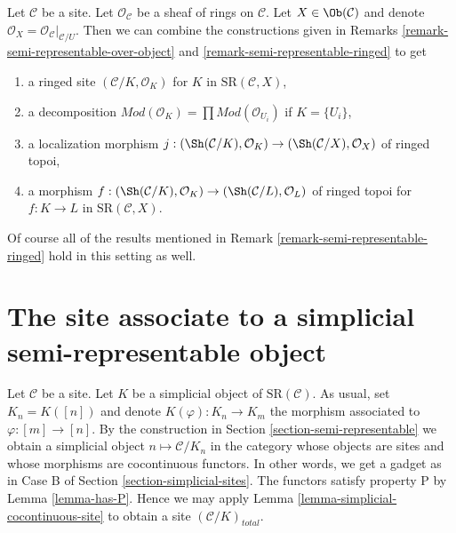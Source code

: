 \begin{remark}
\label{remark-semi-representable-ringed-over-object}
Let $\mathcal{C}$ be a site. Let $\mathcal{O}_\mathcal{C}$
be a sheaf of rings on $\mathcal{C}$. Let $X \in \Ob(\mathcal{C})$
and denote $\mathcal{O}_X = \mathcal{O}_\mathcal{C}|_{\mathcal{C}/U}$.
Then we can combine the constructions given in
Remarks \ref{remark-semi-representable-over-object}
and \ref{remark-semi-representable-ringed} to get
\begin{enumerate}
\item a ringed site $(\mathcal{C}/K, \mathcal{O}_K)$
for $K$ in $\text{SR}(\mathcal{C}, X)$,
\item a decomposition
$\textit{Mod}(\mathcal{O}_K) =
\prod \textit{Mod}(\mathcal{O}_{U_i})$ if $K = \{U_i\}$,
\item a localization morphism
$j : (\Sh(\mathcal{C}/K), \mathcal{O}_K) \to
(\Sh(\mathcal{C}/X), \mathcal{O}_X)$
of ringed topoi,
\item a morphism
$f : (\Sh(\mathcal{C}/K), \mathcal{O}_K) \to
(\Sh(\mathcal{C}/L), \mathcal{O}_L)$ of ringed topoi
for $f : K \to L$ in $\text{SR}(\mathcal{C}, X)$.
\end{enumerate}
Of course all of the results mentioned in
Remark \ref{remark-semi-representable-ringed}
hold in this setting as well.
\end{remark}





\section{The site associate to a simplicial semi-representable object}
\label{section-simplicial-semi-representable}

\noindent
Let $\mathcal{C}$ be a site. Let $K$ be a simplicial object of
$\text{SR}(\mathcal{C})$. As usual, set $K_n = K([n])$ and denote
$K(\varphi) : K_n \to K_m$ the morphism associated to $\varphi : [m] \to [n]$.
By the construction in
Section \ref{section-semi-representable} we obtain a simplicial object
$n \mapsto \mathcal{C}/K_n$ in the category whose objects are sites and
whose morphisms are cocontinuous functors. In other words, we get
a gadget as in Case B of Section \ref{section-simplicial-sites}.
The functors satisfy property P by Lemma \ref{lemma-has-P}.
Hence we may apply
Lemma \ref{lemma-simplicial-cocontinuous-site}
to obtain a site $(\mathcal{C}/K)_{total}$.

